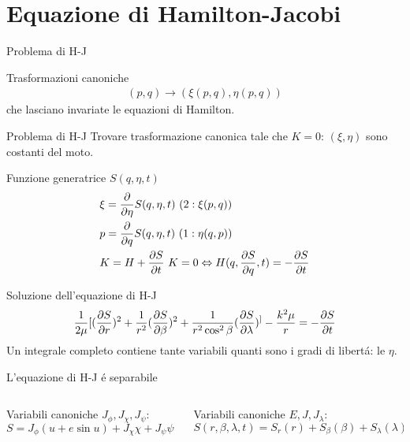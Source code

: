 \section{Equazione di Hamilton-Jacobi}

\begin{frame}{Problema di H-J}
\begin{block}{Trasformazioni canoniche}
\begin{align*}
(p,q)\to(\xi(p,q),\eta(p,q))
\end{align*}
che lasciano invariate le equazioni di Hamilton.
\end{block}
\begin{block}{Problema di H-J}
Trovare trasformazione canonica tale che $K=0$: $(\xi,\eta)$ sono costanti del moto.
\end{block}
\begin{block}{Funzione generatrice $S(q,\eta,t)$}
\begin{align*}
&\xi=\PDof{\eta}S(q,\eta,t)\ (2: \xi(p,q))\\
&p=\PDof{q}S(q,\eta,t)\ (1:\eta(q,p))\\
&K=H+\PDy{t}{S}\ K=0\Leftrightarrow H(q,\PDy{q}{S},t)=-\PDy{t}{S}
\end{align*}
\end{block}
\end{frame}

\begin{frame}{Soluzione dell'equazione di H-J}
\begin{align*}
\frac{1}{2\mu}[(\PDy{r}{S})^2+\frac{1}{r^2}(\PDy{\beta}{S})^2+\frac{1}{r^2\cos^2{\beta}}(\PDy{\lambda}{S})^]-\frac{k^2\mu}{r}=-\PDy{t}{S}
\end{align*}
Un integrale completo contiene tante variabili quanti sono i gradi di libert\'a: le $\eta$.
\begin{block}{L'equazione di H-J \'e separabile}
\begin{columns}
\begin{column}{0.5\textwidth}
Variabili canoniche $J_{\phi}, J_{\chi}, J_{\psi}$:
\begin{equation*}
S=J_{\phi}(u+e\sin{u})+J_{\chi}\chi+J_{\psi}\psi-Et
\end{equation*}
\end{column}
\begin{column}{0.5\textwidth}
Variabili canoniche $E, J, J_{\lambda}$:
\begin{equation*}
S(r,\beta,\lambda,t)=S_r(r)+S_{\beta}(\beta)+S_{\lambda}(\lambda)-\sigma t
\end{equation*}
\end{column}
\end{columns}
\end{block}
\end{frame}

